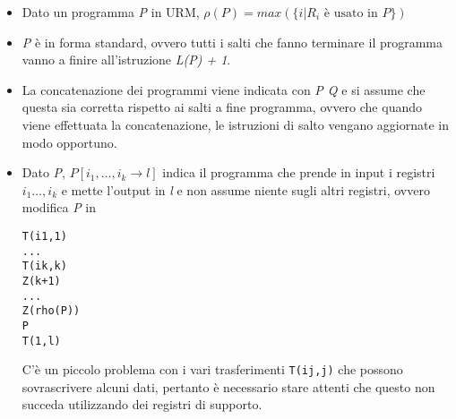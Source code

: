 \begin{itemize}
\item
  Dato un programma \emph{P} in URM, $\rho(P) = max(\{i |  R_i \text{ è usato in }P\})$
\item
  \emph{P} è in forma standard, ovvero tutti i salti che fanno terminare
  il programma vanno a finire all'istruzione \emph{L(P) + 1}.
\item
  La concatenazione dei programmi viene indicata con \emph{P Q} e si
  assume che questa sia corretta rispetto ai salti a fine programma,
  ovvero che quando viene effettuata la concatenazione, le istruzioni di
  salto vengano aggiornate in modo opportuno.
\item
  Dato \emph{P}, $P[i_1,\ldots, i_k \rightarrow l]$ indica
  il programma che prende in input i registri $i_1\ldots, i_k$ e
  mette l'output in \emph{l} e non assume niente sugli altri registri,
  ovvero modifica \emph{P} in

\begin{lstlisting}[language=URM]
T(i1,1)
...
T(ik,k)
Z(k+1)
...
Z(rho(P))
P
T(1,l)
\end{lstlisting}

  C'è un piccolo problema con i vari trasferimenti \texttt{T(ij,j)} che
  possono sovrascrivere alcuni dati, pertanto è necessario stare attenti che
  questo non succeda utilizzando dei registri di supporto.
\end{itemize}
